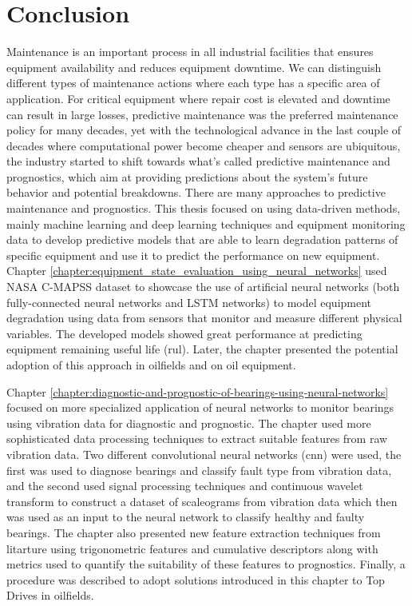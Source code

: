 \chapter*{Conclusion}
Maintenance is an important process in all industrial facilities that ensures equipment availability and reduces equipment downtime. We can distinguish different types of maintenance actions where each type has a specific area of application. For critical equipment where repair cost is elevated and downtime can result in large losses, predictive maintenance was the preferred maintenance policy for many decades, yet with the technological advance in the last couple of decades where computational power become cheaper and sensors are ubiquitous, the industry started to shift towards what's called predictive maintenance and prognostics, which aim at providing predictions about the system's future behavior and potential breakdowns. There are many approaches to predictive maintenance and prognostics. This thesis focused on using data-driven methods, mainly machine learning and deep learning techniques and equipment monitoring data to develop predictive models that are able to learn degradation patterns of specific equipment and use it to predict the performance on new equipment. Chapter \ref{chapter:equipment_state_evaluation_using_neural_networks} used NASA C-MAPSS dataset to showcase the use of artificial neural networks (both fully-connected neural networks and LSTM networks) to model equipment degradation using data from sensors that monitor and measure different physical variables. The developed models showed great performance at predicting equipment remaining useful life (\acrshort{rul}). Later, the chapter presented the potential adoption of this approach in oilfields and on oil equipment.

Chapter \ref{chapter:diagnostic-and-prognostic-of-bearings-using-neural-networks} focused on more specialized application of neural networks to monitor bearings using vibration data for diagnostic and prognostic. The chapter used more sophisticated data processing techniques to extract suitable features from raw vibration data. Two different convolutional neural networks (\acrshort{cnn}) were  used, the first was used to diagnose bearings and classify fault type from vibration data, and the second used signal processing techniques and continuous wavelet transform to construct a dataset of scaleograms from vibration data which then was used as an input to the neural network to classify healthy and faulty bearings. The chapter also presented new feature extraction techniques from litarture using trigonometric features and cumulative descriptors along with metrics used to quantify the suitability of these features to prognostics. Finally, a procedure was described to adopt solutions introduced in this chapter to Top Drives in oilfields.
